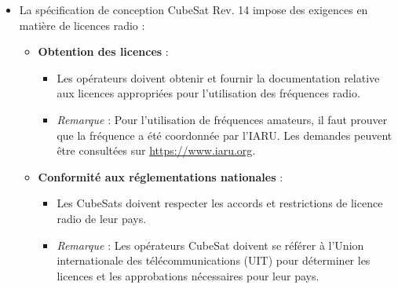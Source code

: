 \begin{itemize}
    \item La spécification de conception CubeSat Rev. 14 impose des exigences en matière de licences radio :
    \begin{itemize}
        \item \textbf{Obtention des licences} :
        \begin{itemize}
            \item Les opérateurs doivent obtenir et fournir la documentation relative aux licences appropriées pour l’utilisation des fréquences radio.
            \item \textit{Remarque} : Pour l'utilisation de fréquences amateurs, il faut prouver que la fréquence a été coordonnée par l'IARU. Les demandes peuvent être consultées sur \url{https://www.iaru.org}.
        \end{itemize}
        \item \textbf{Conformité aux réglementations nationales} :
        \begin{itemize}
            \item Les CubeSats doivent respecter les accords et restrictions de licence radio de leur pays.
            \item \textit{Remarque} : Les opérateurs CubeSat doivent se référer à l'Union internationale des télécommunications (UIT) pour déterminer les licences et les approbations nécessaires pour leur pays.
        \end{itemize}
    \end{itemize}
\end{itemize}
